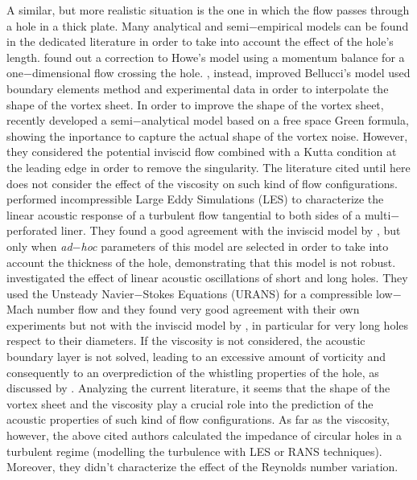 \documentclass{jfm}
\begin{document}
A similar, but more realistic situation is the one in which the flow passes through a hole in a thick plate. Many analytical and semi$-$empirical models can be found in the dedicated literature in order to take into account the effect of the hole's length. 
\citet{bellucci2004use} found out a correction to Howe's model using a momentum balance for a one$-$dimensional flow crossing the hole. \citet{jing2000effect}, instead, improved Bellucci's model used boundary elements method and experimental data in order to interpolate the shape of the vortex sheet.
In order to improve the shape of the vortex sheet, recently \citet{yang2016semi} developed a semi$-$analytical model based on a free space Green formula, showing the inportance to capture the actual shape of the vortex noise. However, they considered the potential inviscid flow combined with a Kutta condition at the leading edge \citep{crighton1985kutta} in order to remove the singularity.
The literature cited until here does not consider the effect of the viscosity on such kind of flow configurations. \citet{eldredge2007numerical} performed incompressible Large Eddy Simulations (LES) to characterize the linear acoustic response of a turbulent flow tangential to both sides of a multi$-$perforated liner. They found a good agreement with the inviscid model by \citet{jing2000effect}, but only when \emph{ad$-$hoc} parameters of this model are selected in order to take into account the thickness of the hole, demonstrating that this model is not robust. \citet{su2015measurements} investigated the effect of linear acoustic oscillations of short and long holes. They used the Unsteady Navier$-$Stokes Equations (URANS) for a compressible low$-$Mach number flow and they found very good agreement with their own experiments but not with the inviscid model by \citet{jing2000effect}, in particular for very long holes respect to their diameters. If the viscosity is not considered, the acoustic boundary layer is not solved, leading to an excessive amount of vorticity and consequently to an overprediction of the whistling properties of the hole, as discussed by \citet{kierkegaard2012simulations}.
Analyzing the current literature, it seems that the shape of the vortex sheet and the viscosity play a crucial role into the prediction of the acoustic properties of such kind of flow configurations. As far as the viscosity, however, the above cited authors calculated the impedance of circular holes in a turbulent regime (modelling the turbulence with LES or RANS techniques). Moreover, they didn't characterize the effect of the Reynolds number variation.
\end{document}
